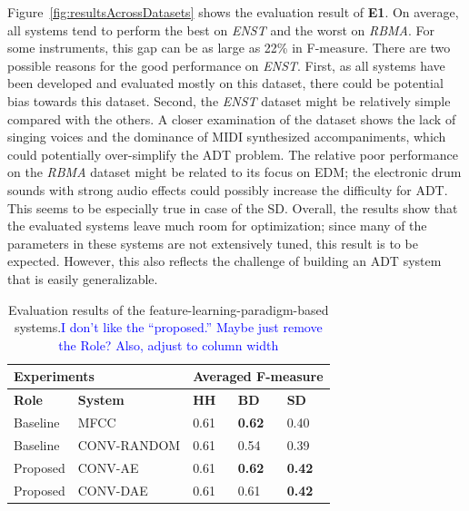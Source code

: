 \documentclass{article}
\newcommand{\comment}[1]{{\textcolor{blue}{#1}}}
\begin{document}
Figure~\ref{fig:resultsAcrossDatasets} shows the evaluation result of \textbf{E1}. On average, all systems tend to perform the best on \textit{ENST} and the worst on \textit{RBMA}. For some instruments, this gap can be as large as 22\% in F-measure. 
There are two possible reasons for the good performance on \textit{ENST}. First, as all systems have been developed and evaluated mostly on this dataset, there could be potential bias towards this dataset. Second, the \textit{ENST} dataset might be relatively simple compared with the others. A closer examination of the dataset shows the lack of singing voices and the dominance of MIDI synthesized accompaniments, which could potentially over-simplify the ADT problem. 
The relative poor performance on the \textit{RBMA} dataset might be related to its focus on EDM; the electronic drum sounds with strong audio effects could possibly increase the difficulty for ADT. This seems to be especially true in case of the SD.
Overall, the results show that the evaluated systems leave much room for optimization; since many of the parameters in these systems are not extensively tuned, this result is to be expected. However, this also reflects the challenge of building an ADT system that is easily generalizable. 

\begin{table}[]
\centering
\begin{tabular}{lllll}
\hline
\multicolumn{2}{l}{\textbf{Experiments}}             & \multicolumn{3}{l}{\textbf{Averaged F-measure}} \\ \hline
\textbf{Role} & \multicolumn{1}{l|}{\textbf{System}} & \textbf{HH}   & \textbf{BD}    & \textbf{SD}    \\ \hline
Baseline      & \multicolumn{1}{l|}{MFCC}            & 0.61          & \textbf{0.62}  & 0.40           \\
Baseline      & \multicolumn{1}{l|}{CONV-RANDOM}    & 0.61          & 0.54           & 0.39           \\
Proposed      & \multicolumn{1}{l|}{CONV-AE}        & 0.61          & \textbf{0.62}  & \textbf{0.42}  \\
Proposed      & \multicolumn{1}{l|}{CONV-DAE}       & 0.61          & 0.61           & \textbf{0.42}  \\ \hline
\end{tabular}
\caption{Evaluation results of the feature-learning-paradigm-based systems.\comment{I don't like the ``proposed.'' Maybe just remove the Role? Also, adjust to column width}}
\label{tab:e2result}
\end{table}
\end{document}
